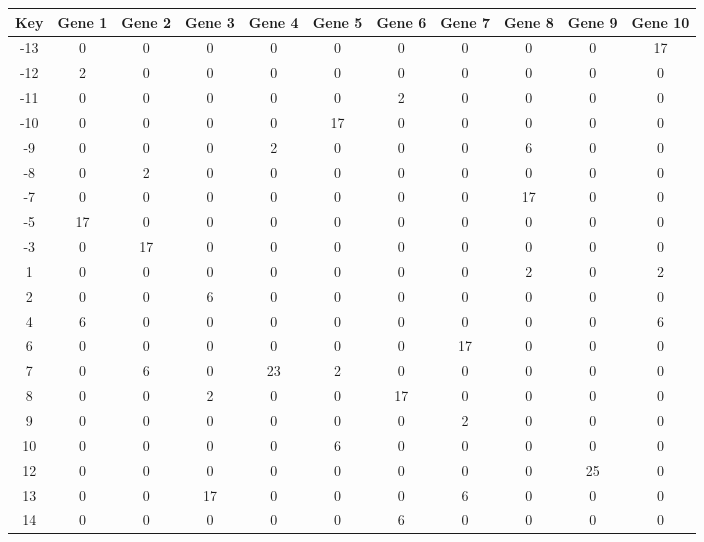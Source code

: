 \begin{tabular}{|c|c|c|c|c|c|c|c|c|c|c|}
\hline
Key & Gene 1 & Gene 2 & Gene 3 & Gene 4 & Gene 5 & Gene 6 & Gene 7 & Gene 8 & Gene 9 & Gene 10 \\
\hline
-13 & 0 & 0 & 0 & 0 & 0 & 0 & 0 & 0 & 0 & 17 \\
-12 & 2 & 0 & 0 & 0 & 0 & 0 & 0 & 0 & 0 & 0 \\
-11 & 0 & 0 & 0 & 0 & 0 & 2 & 0 & 0 & 0 & 0 \\
-10 & 0 & 0 & 0 & 0 & 17 & 0 & 0 & 0 & 0 & 0 \\
-9 & 0 & 0 & 0 & 2 & 0 & 0 & 0 & 6 & 0 & 0 \\
-8 & 0 & 2 & 0 & 0 & 0 & 0 & 0 & 0 & 0 & 0 \\
-7 & 0 & 0 & 0 & 0 & 0 & 0 & 0 & 17 & 0 & 0 \\
-5 & 17 & 0 & 0 & 0 & 0 & 0 & 0 & 0 & 0 & 0 \\
-3 & 0 & 17 & 0 & 0 & 0 & 0 & 0 & 0 & 0 & 0 \\
1 & 0 & 0 & 0 & 0 & 0 & 0 & 0 & 2 & 0 & 2 \\
2 & 0 & 0 & 6 & 0 & 0 & 0 & 0 & 0 & 0 & 0 \\
4 & 6 & 0 & 0 & 0 & 0 & 0 & 0 & 0 & 0 & 6 \\
6 & 0 & 0 & 0 & 0 & 0 & 0 & 17 & 0 & 0 & 0 \\
7 & 0 & 6 & 0 & 23 & 2 & 0 & 0 & 0 & 0 & 0 \\
8 & 0 & 0 & 2 & 0 & 0 & 17 & 0 & 0 & 0 & 0 \\
9 & 0 & 0 & 0 & 0 & 0 & 0 & 2 & 0 & 0 & 0 \\
10 & 0 & 0 & 0 & 0 & 6 & 0 & 0 & 0 & 0 & 0 \\
12 & 0 & 0 & 0 & 0 & 0 & 0 & 0 & 0 & 25 & 0 \\
13 & 0 & 0 & 17 & 0 & 0 & 0 & 6 & 0 & 0 & 0 \\
14 & 0 & 0 & 0 & 0 & 0 & 6 & 0 & 0 & 0 & 0 \\
\hline
\end{tabular}
